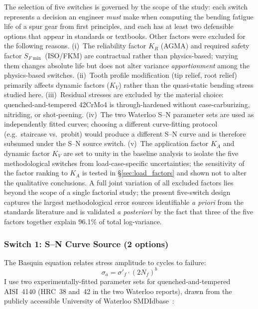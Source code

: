 \documentclass[twocolumn,12pt,a4paper]{article}
\begin{document}
The selection of five switches is governed by the scope of the study:
each switch represents a decision an engineer \emph{must} make when
computing the bending fatigue life of a spur gear from first
principles, and each has at least two defensible options that appear in
standards or textbooks. Other factors were excluded for the following
reasons. (i)~The reliability factor $K_R$ (AGMA) and required safety
factor $S_{F\min}$ (ISO/FKM) are contractual rather than
physics-based; varying them changes absolute life but does not alter
variance \emph{apportionment} among the physics-based switches.
(ii)~Tooth profile modification (tip relief, root relief) primarily
affects dynamic factors ($K_V$) rather than the quasi-static bending
stress studied here. (iii)~Residual stresses are excluded by the
material choice: quenched-and-tempered 42CrMo4 is through-hardened
without case-carburizing, nitriding, or shot-peening.
(iv)~The two Waterloo S--N parameter sets are used as independently
fitted curves; choosing a different curve-fitting protocol (e.g.\
staircase vs.\ probit) would produce a different S--N curve and is
therefore subsumed under the S--N source switch.
(v)~The application factor $K_A$ and dynamic factor $K_V$ are set to
unity in the baseline analysis to isolate the five methodological
switches from load-case-specific uncertainties; the sensitivity of the
factor ranking to $K_A$ is tested in \S\ref{sec:load_factors} and
shown not to alter the qualitative conclusions. A full joint variation
of all excluded factors lies beyond the scope of a single factorial
study; the present five-switch design captures the largest
methodological error sources identifiable \emph{a priori} from the
standards literature and is validated \emph{a posteriori} by the fact
that three of the five factors together explain 96.1\% of total
log-variance.

\subsubsection{Switch 1: S--N Curve Source (2 options)}

The Basquin equation relates stress amplitude to cycles to failure:
\begin{equation}
\sigma_a = \sigma'_f \cdot (2N_f)^b
\label{eq:basquin}
\end{equation}
I use two experimentally-fitted
parameter sets for quenched-and-tempered AISI~4140 (HRC~38 and~42 in
the two Waterloo reports), drawn from the publicly accessible
University of Waterloo SMDIdbase~\cite{waterloo_fde}:
\end{document}
